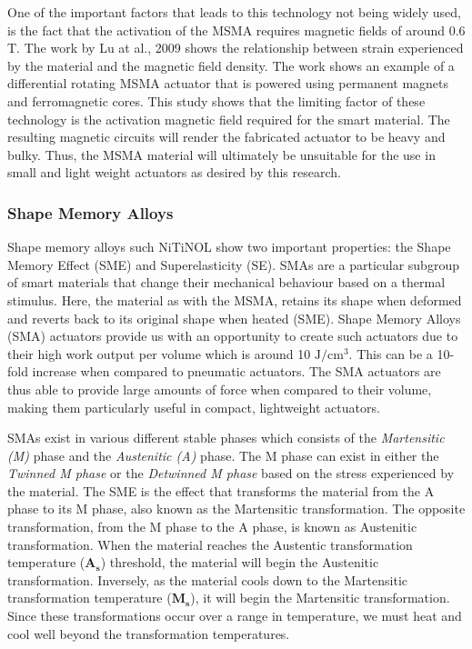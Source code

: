 One of the important factors that leads to this technology not being widely used, is the fact that the activation of the MSMA requires magnetic fields of around 0.6 T. The work by Lu at al., 2009\cite{lu_optimal_2009} shows the relationship between strain experienced by the material and the magnetic field density. The work shows an example of a differential rotating MSMA actuator that is powered using permanent magnets and ferromagnetic cores. This study shows that the limiting factor of these technology is the activation magnetic field required for the smart material. The resulting magnetic circuits will render the fabricated actuator to be heavy and bulky. Thus, the MSMA material will ultimately be unsuitable for the use in small and light weight actuators as desired by this research.

\subsubsection{Shape Memory Alloys}
Shape memory alloys such NiTiNOL show two important properties: the Shape Memory Effect (SME) and Superelasticity (SE)\cite{rao_design_2015}. SMAs are a particular subgroup of smart materials that change their mechanical behaviour based on a thermal stimulus. Here, the material as with the MSMA, retains its shape when deformed and reverts back to its original shape when heated (SME). Shape Memory Alloys (SMA) actuators provide us with an opportunity to create such actuators due to their high work output per volume which is around 10 $\mathrm{J}/\mathrm{cm}^3$\cite{mohd_jani_review_2014}. This can be a 10-fold increase when compared to pneumatic actuators. The SMA actuators are thus able to provide large amounts of force when compared to their volume, making them particularly useful in compact, lightweight actuators.

SMAs exist in various different stable phases which consists of the \emph{Martensitic (M)} phase and the \emph{Austenitic (A)} phase. The M phase can exist in either the \emph{Twinned M phase} or the \emph{Detwinned M phase} based on the stress experienced by the material. The SME is the effect that transforms the material from the A phase to its M phase, also known as the Martensitic transformation. The opposite transformation, from the M phase to the A phase, is known as Austenitic transformation. When the material reaches the Austentic transformation temperature ($\mathbf{A_s}$) threshold, the material will begin the Austenitic transformation. Inversely, as the material cools down to the Martensitic transformation temperature ($\mathbf{M_s}$), it will begin the Martensitic transformation. Since these transformations occur over a range in temperature, we must heat and cool well beyond the transformation temperatures.

